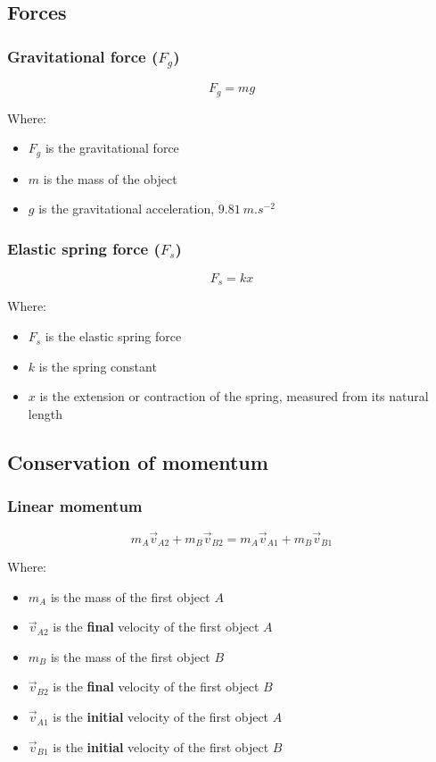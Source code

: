 \documentclass[11pt]{article}
\begin{document}
\subsection{Forces}
\label{sec:orgd6bc0f8}

\subsubsection{Gravitational force (\(F_g\))}
\label{sec:orgad51eb2}
\[F_g = mg\]

Where:
\begin{itemize}
\item \(F_g\) is the gravitational force
\item \(m\) is the mass of the object
\item \(g\) is the gravitational acceleration, \(\qty{9.81}{m.s^{-2}}\)
\end{itemize}

\subsubsection{Elastic spring force (\(F_s\))}
\label{sec:org155127a}
\[F_s = kx\]

Where:
\begin{itemize}
\item \(F_s\) is the elastic spring force
\item \(k\) is the spring constant
\item \(x\) is the extension or contraction of the spring, measured from its natural length
\end{itemize}

\subsection{Conservation of momentum}
\label{sec:org09e7a22}

\subsubsection{Linear momentum}
\label{sec:org74ec8c7}
\[m_A \vec{v}_{A2} + m_B \vec{v}_{B2} = m_A \vec{v}_{A1} + m_B \vec{v}_{B1}\]

Where:
\begin{itemize}
\item \(m_A\) is the mass of the first object \(A\)
\item \(\vec{v}_{A2}\) is the \textbf{final} velocity of the first object \(A\)
\item \(m_B\) is the mass of the first object \(B\)
\item \(\vec{v}_{B2}\) is the \textbf{final} velocity of the first object \(B\)
\item \(\vec{v}_{A1}\) is the \textbf{initial} velocity of the first object \(A\)
\item \(\vec{v}_{B1}\) is the \textbf{initial} velocity of the first object \(B\)
\end{itemize}
\end{document}
